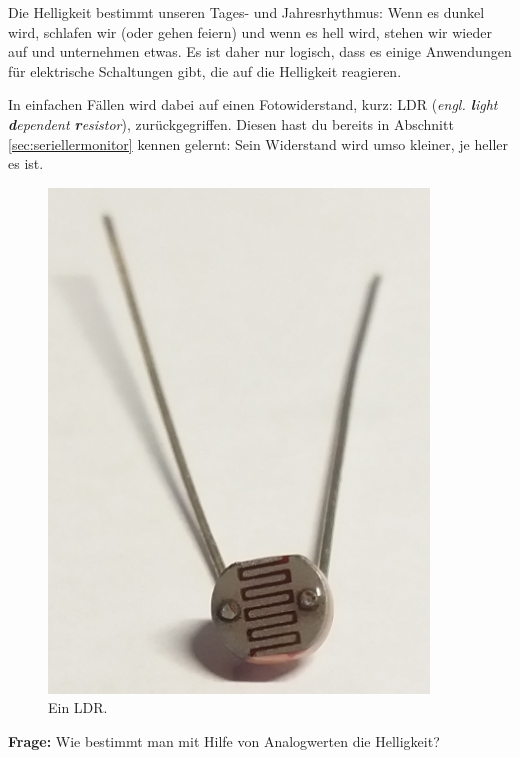 \begin{minipage}{0.84\textwidth}
	Die Helligkeit bestimmt unseren Tages- und Jahresrhythmus: Wenn es dunkel wird, schlafen wir (oder gehen feiern) und wenn es hell wird, stehen wir wieder auf und unternehmen etwas. Es ist daher nur logisch, dass es einige Anwendungen für elektrische Schaltungen gibt, die auf die Helligkeit reagieren.
	
	In einfachen Fällen wird dabei auf einen Fotowiderstand, kurz: LDR (\emph{engl. \textbf{l}ight \textbf{d}ependent \textbf{r}esistor}), zurückgegriffen. Diesen hast du bereits in Abschnitt \ref{sec:seriellermonitor} kennen gelernt: Sein Widerstand wird umso kleiner, je heller es ist.
\end{minipage}
\hfill
\begin{minipage}{0.14\textwidth}
	\begin{figure}[H]
		\centering
		\includegraphics[width=0.9\textwidth]{./pics/ldr.jpg}
		\caption{Ein LDR.}
	\end{figure}
\end{minipage}

\begin{ziel}
	\textbf{Frage:} Wie bestimmt man mit Hilfe von Analogwerten die Helligkeit?
\end{ziel}

